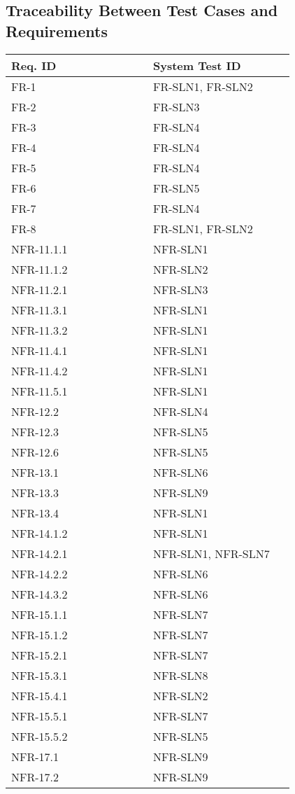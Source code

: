 \documentclass[12pt, titlepage]{article}
\begin{document}
\subsection{Traceability Between Test Cases and Requirements}

\begin{longtable}{|p{0.45\linewidth}|p{0.45\linewidth}|}
  \hline
  \textbf{Req. ID} & \textbf{System Test ID} \\
  \hline
  FR-1 & FR-SLN1, FR-SLN2 \\
  \hline
  FR-2 & FR-SLN3 \\
  \hline
  FR-3 & FR-SLN4 \\
  \hline
  FR-4 & FR-SLN4 \\
  \hline
  FR-5 & FR-SLN4 \\
  \hline
  FR-6 & FR-SLN5 \\
  \hline
  FR-7 & FR-SLN4 \\
  \hline
  FR-8 & FR-SLN1, FR-SLN2 \\
  \hline
  NFR-11.1.1 & NFR-SLN1 \\
  \hline
  NFR-11.1.2 & NFR-SLN2 \\
  \hline
  NFR-11.2.1 & NFR-SLN3 \\
  \hline
  NFR-11.3.1 & NFR-SLN1 \\
  \hline
  NFR-11.3.2 & NFR-SLN1 \\
  \hline
  NFR-11.4.1 & NFR-SLN1 \\
  \hline
  NFR-11.4.2 & NFR-SLN1 \\
  \hline
  NFR-11.5.1 & NFR-SLN1 \\
  \hline
  NFR-12.2 & NFR-SLN4 \\
  \hline
  NFR-12.3 & NFR-SLN5 \\
  \hline
  NFR-12.6 & NFR-SLN5 \\
  \hline
  NFR-13.1 & NFR-SLN6 \\
  \hline
  NFR-13.3 & NFR-SLN9 \\
  \hline
  NFR-13.4 & NFR-SLN1 \\
  \hline
  NFR-14.1.2 & NFR-SLN1 \\
  \hline
  NFR-14.2.1 & NFR-SLN1, NFR-SLN7 \\
  \hline
  NFR-14.2.2 & NFR-SLN6 \\
  \hline
  NFR-14.3.2 & NFR-SLN6 \\
  \hline
  NFR-15.1.1 & NFR-SLN7 \\
  \hline
  NFR-15.1.2 & NFR-SLN7 \\
  \hline
  NFR-15.2.1 & NFR-SLN7 \\
  \hline
  NFR-15.3.1 & NFR-SLN8 \\
  \hline
  NFR-15.4.1 & NFR-SLN2 \\
  \hline
  NFR-15.5.1 & NFR-SLN7 \\
  \hline
  NFR-15.5.2 & NFR-SLN5 \\
  \hline
  NFR-17.1 & NFR-SLN9 \\
  \hline
  NFR-17.2 & NFR-SLN9 \\
  \hline
\end{longtable}
\end{document}
